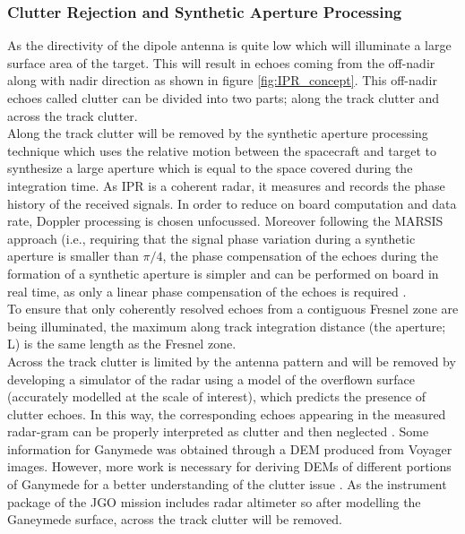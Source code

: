 \subsubsection{Clutter Rejection and Synthetic Aperture Processing}
As the directivity of the dipole antenna is quite low which will illuminate a large surface area of the target. This will result in echoes coming from the off-nadir along with nadir direction as shown in figure \ref{fig:IPR_concept}. This off-nadir echoes called clutter can be divided into two parts; along the track clutter and across the track clutter.\\
%
Along the track clutter will be removed by the synthetic aperture processing technique which uses the relative motion between the spacecraft and target to synthesize a large aperture which is equal to the space covered during the integration time. As \ac{IPR} is a coherent radar, it measures and records the phase history of the received signals. In order to reduce on board computation and data rate, Doppler processing is chosen unfocussed. Moreover following the \ac{MARSIS} approach \cite{MARSIS} (i.e., requiring that the signal phase variation during a synthetic aperture is smaller than $\pi/4$, the phase compensation of the echoes during the formation of a synthetic aperture is simpler and can be performed on board in real time, as only a linear phase compensation of the echoes is required \cite{Gany_SRS}.\\
%
To ensure that only coherently resolved echoes from a contiguous Fresnel zone are being illuminated, the maximum along track integration distance (the aperture; L) is the same length as the Fresnel zone.
\\
Across the track clutter is limited by the antenna pattern and will be removed by developing a simulator of the radar using a model of the overflown surface (accurately modelled at the scale of interest), which predicts the presence of clutter echoes. In this way, the corresponding echoes appearing in the measured radar-gram can be properly interpreted as clutter and then neglected \cite{SHARAD}. Some information for Ganymede was obtained through a \ac{DEM} produced from Voyager images. However, more work is necessary for deriving \acp{DEM} of different portions of Ganymede for a better understanding of the clutter issue \cite{Gany_SRS}.
As the instrument package of the \ac{JGO} mission includes radar altimeter so after modelling the Ganeymede surface, across the track clutter will be removed.

